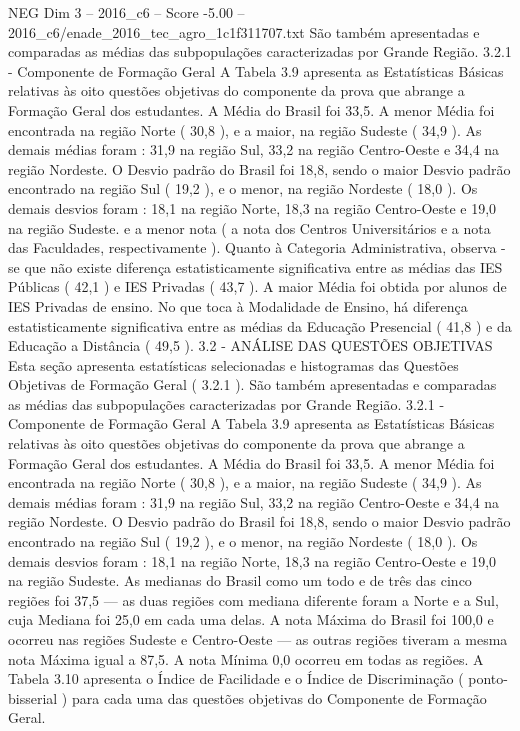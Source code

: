 \begin{textsample}{NEG Dim 3 – 2016\_c6 – Score -5.00 – 2016\_c6/enade\_2016\_tec\_agro\_1c1f311707.txt}
São também apresentadas e comparadas as médias das subpopulações caracterizadas por Grande Região. 3.2.1 - Componente de Formação Geral A Tabela 3.9 apresenta as Estatísticas Básicas relativas às oito questões objetivas do componente da prova que abrange a Formação Geral dos estudantes.
A Média do Brasil foi 33,5.
A menor Média foi encontrada na região Norte ( 30,8 ), e a maior, na região Sudeste ( 34,9 ).
As demais médias foram : 31,9 na região Sul, 33,2 na região Centro-Oeste e 34,4 na região Nordeste.
O Desvio padrão do Brasil foi 18,8, sendo o maior Desvio padrão encontrado na região Sul ( 19,2 ), e o menor, na região Nordeste ( 18,0 ).
Os demais desvios foram : 18,1 na região Norte, 18,3 na região Centro-Oeste e 19,0 na região Sudeste. e a menor nota ( a nota dos Centros Universitários e a nota das Faculdades, respectivamente ).
Quanto à Categoria Administrativa, observa -se que não existe diferença estatisticamente significativa entre as médias das IES Públicas ( 42,1 ) e IES Privadas ( 43,7 ).
A maior Média foi obtida por alunos de IES Privadas de ensino.
No que toca à Modalidade de Ensino, há diferença estatisticamente significativa entre as médias da Educação Presencial ( 41,8 ) e da Educação a Distância ( 49,5 ). 3.2 - ANÁLISE DAS QUESTÕES OBJETIVAS Esta seção apresenta estatísticas selecionadas e histogramas das Questões Objetivas de Formação Geral ( 3.2.1 ).
São também apresentadas e comparadas as médias das subpopulações caracterizadas por Grande Região. 3.2.1 - Componente de Formação Geral A Tabela 3.9 apresenta as Estatísticas Básicas relativas às oito questões objetivas do componente da prova que abrange a Formação Geral dos estudantes.
A Média do Brasil foi 33,5.
A menor Média foi encontrada na região Norte ( 30,8 ), e a maior, na região Sudeste ( 34,9 ).
As demais médias foram : 31,9 na região Sul, 33,2 na região Centro-Oeste e 34,4 na região Nordeste.
O Desvio padrão do Brasil foi 18,8, sendo o maior Desvio padrão encontrado na região Sul ( 19,2 ), e o menor, na região Nordeste ( 18,0 ).
Os demais desvios foram : 18,1 na região Norte, 18,3 na região Centro-Oeste e 19,0 na região Sudeste.
As medianas do Brasil como um todo e de três das cinco regiões foi 37,5 — as duas regiões com mediana diferente foram a Norte e a Sul, cuja Mediana foi 25,0 em cada uma delas.
A nota Máxima do Brasil foi 100,0 e ocorreu nas regiões Sudeste e Centro-Oeste — as outras regiões tiveram a mesma nota Máxima igual a 87,5.
A nota Mínima 0,0 ocorreu em todas as regiões.
A Tabela 3.10 apresenta o Índice de Facilidade e o Índice de Discriminação ( ponto-bisserial ) para cada uma das questões objetivas do Componente de Formação Geral.

\end{textsample}
